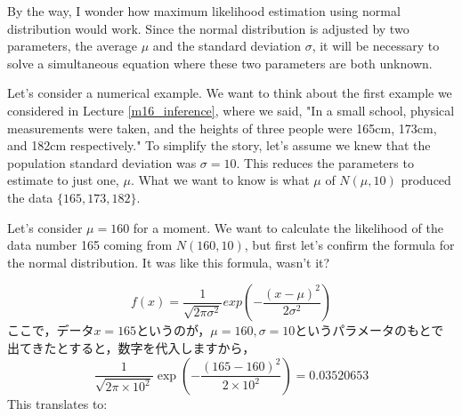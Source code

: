 \documentclass{ltjsbook}
\begin{document}
By the way, I wonder how maximum likelihood estimation using normal distribution would work. Since the normal distribution is adjusted by two parameters, the average $\mu$ and the standard deviation $\sigma$, it will be necessary to solve a simultaneous equation where these two parameters are both unknown.

Let's consider a numerical example. We want to think about the first example we considered in Lecture \ref{m16_inference}, where we said, "In a small school, physical measurements were taken, and the heights of three people were 165cm, 173cm, and 182cm respectively." To simplify the story, let's assume we knew that the population standard deviation was $\sigma=10$. This reduces the parameters to estimate to just one, $\mu$. What we want to know is what $\mu$ of $N(\mu,10)$ produced the data $\{165, 173, 182\}$.

Let's consider $\mu=160$ for a moment. We want to calculate the likelihood of the data number 165 coming from $N(160,10)$, but first let's confirm the formula for the normal distribution. It was like this formula, wasn't it?

\[ 	f(x)= \frac{1}{\sqrt{2\pi \sigma^2}} exp\left(-\frac{(x-\mu)^2}{2\sigma^2}\right) \]
ここで，データ$x=165$というのが，$\mu=160,\sigma=10$というパラメータのもとで出てきたとすると，数字を代入しますから，
\[ \frac{1}{\sqrt{2\pi \times 10^2}} \exp\left(-\frac{(165-160)^2}{2\times 10^2}\right) = 0.03520653 \]
This translates to:
\end{document}
